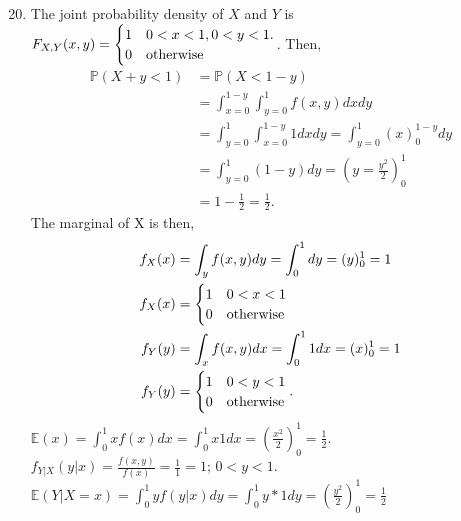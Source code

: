 \documentclass{article}
\begin{document}
\begin{enumerate}
    \setcounter{enumi}{19}
    \item
    
    The joint probability density of $X$ and $Y$ is $F_{X,Y}(x, y)=\begin{cases}
    1 & 0<x<1, 0<y<1.\crcr
    0 &\text{otherwise}
    \end{cases}$. Then,
    \begin{align*}
        \mathbb{P}(X+y<1)&=\mathbb{P}(X<1-y)\\
        &= \int_{x=0}^{1-y}\int_{y=0}^{1}f(x, y)dxdy\\
        &= \int_{y=0}^{1}\int_{x=0}^{1-y}1dxdy=\int_{y=0}^1(x)^{1-y}_0dy\\
        &= \int_{y=0}^1(1-y)dy=(y=\frac{y^2}{2})^1_0\\
        &= 1-\frac{1}{2}=\frac{1}{2}.
    \end{align*} The marginal of X is then, 
    \begin{align*}
        f_X(x)&=\int_yf(x,y)dy=\int_0^1dy=(y)^1_0=1\\
        f_X(x)&=\begin{cases}
        1 & 0<x<1\crcr
        0 & \text{otherwise}
        \end{cases}\\
        f_Y(y)&=\int_xf(x,y)dx=\int_0^11dx=(x)^1_0=1\\
        f_Y(y)&=\begin{cases}
        1 & 0<y<1\crcr
        0 &\text{otherwise}
        \end{cases}.
    \end{align*}$\mathbb{E}(x)=\int_0^1xf(x)dx=\int_0^1x1dx=(\frac{x^2}{2})^1_0=\frac{1}{2}.$\\
    $f_{Y|X}(y|x)=\frac{f(x,y)}{f(x)}=\frac{1}{1}=1$; $0<y<1$.\\
    $\mathbb{E}(Y|X=x)=\int_0^1yf(y|x)dy=\int_0^1y*1dy=(\frac{y^2}{2})^1_0=\frac{1}{2}$
    
\end{enumerate}
\end{document}
